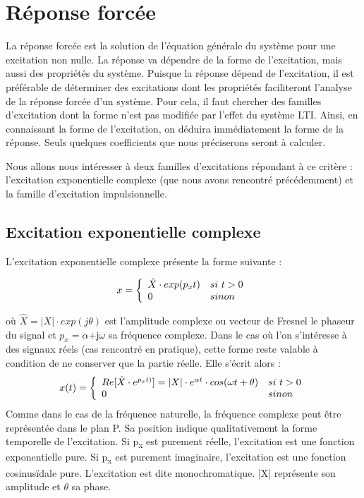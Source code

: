 	
	\section{Réponse forcée}
	
	La réponse forcée est la solution de l'équation générale du système pour une excitation non nulle. La réponse va dépendre de la forme de l'excitation, mais aussi des
	propriétés du système. Puisque la réponse dépend de l'excitation, il est
	préférable de déterminer des excitations dont les propriétés
	faciliteront l'analyse de la réponse forcée d'un système. Pour cela, il
	faut chercher des familles d'excitation dont la forme n'est pas modifiée
	par l'effet du système LTI. Ainsi, en connaissant la forme de
	l'excitation, on déduira immédiatement la forme de la réponse. Seuls
	quelques coefficients que nous préciserons seront à calculer.
	
	Nous allons nous intéresser à deux familles d'excitations répondant à ce critère : l'excitation
	exponentielle complexe (que nous avons rencontré précédemment) et la
	famille d'excitation impulsionnelle.
	
	\subsection{Excitation exponentielle complexe}
	L'excitation exponentielle complexe présente la forme suivante :
	
	\begin{equation}\label{exc_expo_complexe}
		x =    \left \{
		\begin{array}{l l}
		\hat{X} \cdot exp(p_{x}t)  & si~t>0 \\
		0   & sinon \\
		\end{array}
		\right .
	\end{equation}
	
	où $ \hat{X} = |X| \cdot exp(j \theta)$ est l'amplitude complexe ou vecteur de Fresnel le phaseur du signal et $ p_{x} = \alpha $+j$ \omega $ sa fréquence complexe. Dans le cas où l'on s'intéresse à des signaux réels (cas rencontré en pratique), cette forme reste valable à condition de ne conserver que la partie réelle. Elle s'écrit alors :
	\begin{equation}\label{exc_expo_complexe_reel}
	x(t) =    \left \{
	\begin{array}{l l}
	Re[\hat{X} \cdot e^{p_{x}t)}] = |X| \cdot e^{\alpha t} \cdot cos(\omega t+\theta)  & si~t>0 \\
	0   & sinon \\
	\end{array}
	\right .
	\end{equation}
	Comme dans le cas de la fréquence naturelle, la fréquence complexe peut
	être représentée dans le plan P. Sa position indique qualitativement la
	forme temporelle de l'excitation. Si p\textsubscript{x} est purement
	réelle, l'excitation est une fonction exponentielle pure. Si
	p\textsubscript{x} est purement imaginaire, l'excitation est une fonction
	cosinusïdale pure. L'excitation est dite monochromatique. |X| représente son amplitude et $\theta$ sa phase.
	

